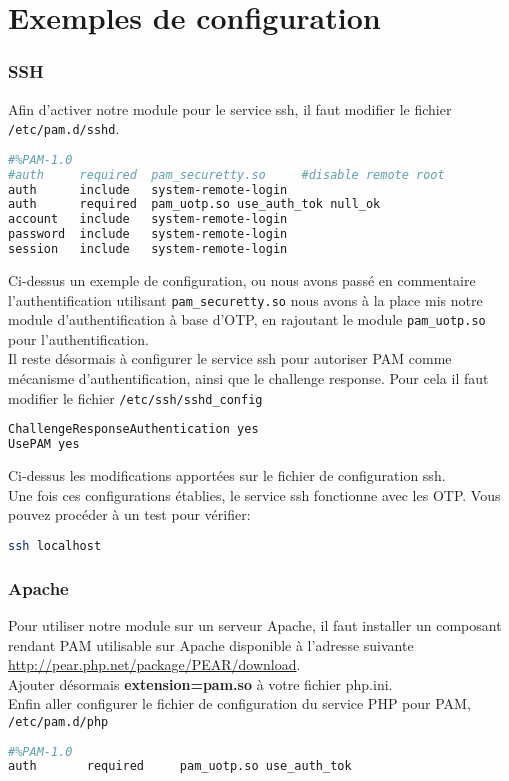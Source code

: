 \documentclass{"../../../res/univ-projet"}
\begin{document}
\newpage

\part{Exemples de configuration}
\section{SSH}
Afin d'activer notre module pour le service ssh, il faut modifier le fichier \verb?/etc/pam.d/sshd?.
\begin{lstlisting}[language=bash, backgroundcolor=\color{black}, basicstyle=\color{white}]
#%PAM-1.0
#auth     required  pam_securetty.so     #disable remote root
auth      include   system-remote-login
auth      required  pam_uotp.so use_auth_tok null_ok
account   include   system-remote-login
password  include   system-remote-login
session   include   system-remote-login
\end{lstlisting}
Ci-dessus un exemple de configuration, ou nous avons passé en commentaire l'authentification utilisant
\verb?pam_securetty.so? nous avons à la place mis notre module d'authentification à base d'OTP, en rajoutant le 
module \verb?pam_uotp.so? pour l'authentification.\\
Il reste désormais à configurer le service ssh pour autoriser PAM comme mécanisme d'authentification, 
ainsi que le challenge response. Pour cela il faut modifier le fichier \verb?/etc/ssh/sshd_config?
\begin{lstlisting}[language=bash, backgroundcolor=\color{black}, basicstyle=\color{white}]
ChallengeResponseAuthentication yes
UsePAM yes
\end{lstlisting}
Ci-dessus les modifications apportées sur le fichier de configuration ssh.\\
Une fois ces configurations établies, le service ssh fonctionne avec les OTP.
Vous pouvez procéder à un test pour vérifier:
\begin{lstlisting}[language=bash, backgroundcolor=\color{black}, basicstyle=\color{white}]
ssh localhost
\end{lstlisting}

\section{Apache}
Pour utiliser notre module sur un serveur Apache, il faut installer un composant rendant PAM utilisable
sur Apache disponible à l'adresse suivante 
\href{http://pear.php.net/package/PEAR/download}{http://pear.php.net/package/PEAR/download}.\\
Ajouter désormais \textbf{extension=pam.so} à votre fichier php.ini.\\
Enfin aller configurer le fichier de configuration du service PHP pour PAM, \verb?/etc/pam.d/php?
\begin{lstlisting}[language=bash, backgroundcolor=\color{black}, basicstyle=\color{white}]
#%PAM-1.0
auth       required     pam_uotp.so use_auth_tok
\end{lstlisting}
\end{document}
